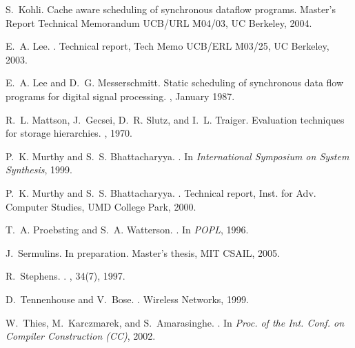 \documentclass{sigplanconf}
\begin{document}
\begin{thebibliography}{10}
S.~Kohli.
\newblock Cache aware scheduling of synchronous dataflow programs.
\newblock Master's Report Technical Memorandum UCB/URL M04/03, UC Berkeley,
  2004.

E.~A. Lee.
.
\newblock Technical report, Tech Memo UCB/ERL M03/25, UC Berkeley, 2003.

E.~A. Lee and D.~G. Messerschmitt.
\newblock Static scheduling of synchronous data flow programs for digital
  signal processing.
, January 1987.

R.~L. Mattson, J.~Gecsei, D.~R. Slutz, and I.~L. Traiger.
\newblock Evaluation techniques for storage hierarchies.
, 1970.

P.~K. Murthy and S.~S. Bhattacharyya.
.
\newblock In {\em International Symposium on System Synthesis}, 1999.

P.~K. Murthy and S.~S. Bhattacharyya.
.
\newblock Technical report, Inst. for Adv. Computer Studies, UMD College Park,
  2000.

T.~A. Proebsting and S.~A. Watterson.
.
\newblock In {\em POPL}, 1996.

J.~Sermulins.
\newblock In preparation.
\newblock Master's thesis, MIT CSAIL, 2005.

R.~Stephens.
.
, 34(7), 1997.

D.~Tennenhouse and V.~Bose.
.
\newblock Wireless Networks, 1999.

W.~Thies, M.~Karczmarek, and S.~Amarasinghe.
.
\newblock In {\em {Proc. of the Int. Conf. on Compiler Construction (CC)}},
  {2002}.

\end{thebibliography}


\end{document}
